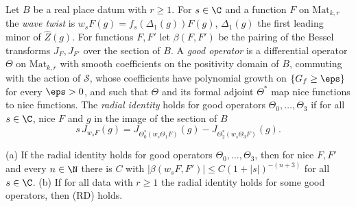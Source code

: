 \begin{definition}\label{pf:sh-curv:radiddef}
Let $B$ be a real place datum with $r\ge1$. For $s\in\C$ and a function $F$ on $\mathrm{Mat}_{k,r}$ the \emph{wave twist} is
$w_sF(g)=f_s(\Delta_1(g))F(g)$, $\Delta_1(g)$ the first leading minor of $\widehat Z(g)$. For functions $F,F'$ let
$\beta(F,F')$ be the pairing of the Bessel transforms $J_F,J_{F'}$ over the section of $B$. A \emph{good operator} is a
differential operator $\Theta$ on $\mathrm{Mat}_{k,r}$ with smooth coefficients on the positivity domain of $B$, commuting with
the action of $\mathcal S$, whose coefficients have polynomial growth on $\{G_f\ge\eps\}$ for every $\eps>0$, and such that
$\Theta$ and its formal adjoint $\Theta^*$ map nice functions to nice functions. The \emph{radial identity} holds for good
operators $\Theta_0,\dots,\Theta_3$ if for all $s\in\C$, nice $F$ and $g$ in the image of the section of $B$
\begin{equation}\label{eq:pf:sh-curv:radid}
s\,J_{w_sF}(g)=J_{\Theta_0^*(w_s\Theta_1F)}(g)-J_{\Theta_2^*(w_s\Theta_3F)}(g).
\end{equation}
\end{definition}

\begin{proposition}\label{pf:sh-curv:raddecay}
(a) If the radial identity holds for good operators $\Theta_0,\dots,\Theta_3$, then for nice $F,F'$ and every $n\in\N$ there
is $C$ with $|\beta(w_sF,F')|\le C(1+|s|)^{-(n+3)}$ for all $s\in\C$.
(b) If for all data with $r\ge1$ the radial identity holds for some good operators, then (RD) holds.
\end{proposition}

